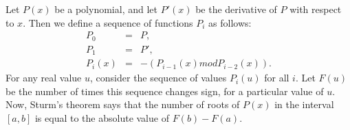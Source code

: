 Let $P(x)$ be a polynomial, and let $P\prime(x)$ be the derivative of $P$ with 
respect to $x$. Then we define a sequence of functions $P_{i}$  as follows:
\begin{eqnarray*}
  P_{0} &=& P,  \\
  P_{1} &=& P', \\
  P_{i}(x) &=& -(P_{i-1}(x) mod P_{i-2}(x)).
\end{eqnarray*}
For any real value $u$, consider the sequence of values $P_{i}(u)$ for
all $i$.  Let $F(u)$ be the number of times this sequence changes sign,
for a particular value of $u$.
Now, Sturm's theorem says that the number of roots of $P(x)$ in the interval 
$[a,b]$ is equal to the absolute value of $F(b)-F(a)$.
